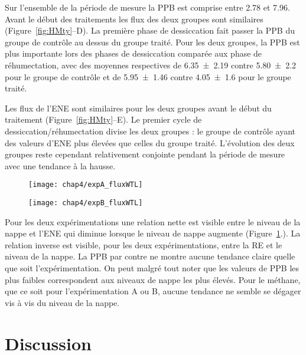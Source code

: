 Sur l'ensemble de la période de mesure la PPB est comprise entre \num{2.78} et \SI{7.96}{\uml}.
Avant le début des traitements les flux des deux groupes sont similaires (Figure~\ref{fig:HMty}--D).
La première phase de dessiccation fait passer la PPB du groupe de contrôle au dessus du groupe traité.
Pour les deux groupes, la PPB est plus importante lors des phases de dessiccation comparée aux phase de réhumectation, avec des moyennes respectives de \num{6.35(219)} contre \num{5.80(220)} pour le groupe de contrôle et de \num{5.95(146)} contre \SI{4.05(160)}{\uml} pour le groupe traité.

Les flux de l'ENE sont similaires pour les deux groupes avant le début du traitement (Figure~\ref{fig:HMty}--E).
Le premier cycle de dessiccation/réhumectation divise les deux groupes : le groupe de contrôle ayant des valeurs d'ENE plus élevées que celles du groupe traité.
L'évolution des deux groupes reste cependant relativement conjointe pendant la période de mesure avec une tendance à la hausse.

\begin{figure}
\centering
\begin{minipage}{.5\textwidth}
  \centering
  \texttt{[image: chap4/expA\_fluxWTL]}
  \label{fig:test1}
\end{minipage}%
\begin{minipage}{.5\textwidth}
  \centering
  \texttt{[image: chap4/expB\_fluxWTL]}
  \label{fig:test2}
\end{minipage}
\end{figure}

Pour les deux expérimentations une relation nette est visible entre le niveau de la nappe et l'ENE qui diminue lorsque le niveau de nappe augmente (Figure~\ref{fig:test2}.).
La relation inverse est visible, pour les deux expérimentations, entre la RE et le niveau de la nappe.
La PPB par contre ne montre aucune tendance claire quelle que soit l'expérimentation.
On peut malgré tout noter que les valeurs de PPB les plus faibles correspondent aux niveaux de nappe les plus élevés.
Pour le méthane, que ce soit pour l'expérimentation A ou B, aucune tendance ne semble se dégager vis à vis du niveau de la nappe.


\section{Discussion}

